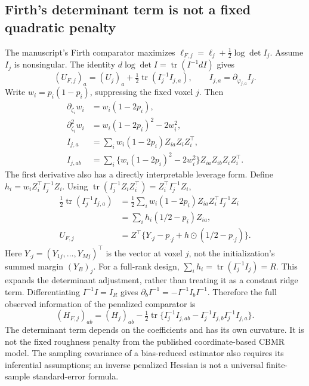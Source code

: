 \documentclass[11pt,a4paper]{article}
\newcommand{\tr}{\operatorname{tr}}
\numberwithin{equation}{section}
\begin{document}
\subsection{Firth's determinant term is not a fixed quadratic penalty}
The manuscript's Firth comparator maximizes
$\ell_{F,j}=\ell_j+\tfrac12\log\det I_j$.
Assume $I_j$ is nonsingular. The identity
$d\log\det I=\tr(I^{-1}dI)$ gives
\begin{equation}
 (U_{F,j})_a=(U_j)_a+\tfrac12\tr(I_j^{-1}I_{j,a}),
 \qquad I_{j,a}=\partial_{\varphi_{j,a}}I_j .
\end{equation}
Write $w_i=p_i(1-p_i)$, suppressing the fixed voxel $j$.
Then
\begin{align}
 \partial_{\zeta_i}w_i&=w_i(1-2p_i),\\
 \partial^2_{\zeta_i}w_i
 &=w_i(1-2p_i)^2-2w_i^2,\\
 I_{j,a}
 &=\sum_i w_i(1-2p_i)Z_{ia}Z_iZ_i^\top,\\
 I_{j,ab}
 &=\sum_i\{w_i(1-2p_i)^2-2w_i^2\}
                         Z_{ia}Z_{ib}Z_iZ_i^\top .
\end{align}
The first derivative also has a directly interpretable
leverage form. Define $h_i=w_i Z_i^\top I_j^{-1}Z_i$.
Using $\tr(I_j^{-1}Z_iZ_i^\top)=Z_i^\top I_j^{-1}Z_i$,
\begin{align}
 \tfrac12\tr(I_j^{-1}I_{j,a})
 &=\tfrac12\sum_i w_i(1-2p_i)Z_{ia}
                               Z_i^\top I_j^{-1}Z_i\\
 &=\sum_i h_i(1/2-p_i)Z_{ia},\\
 U_{F,j}&=Z^\top\{Y_{\cdot j}-p_{\cdot j}
                         +h\mathbin{\odot}(1/2-p_{\cdot j})\}.
\end{align}
Here $Y_{\cdot j}=(Y_{1j},\ldots,Y_{Mj})^\top$ is the vector
at voxel $j$, not the initialization's summed margin $(Y_B)_j$.
For a full-rank design,
$\sum_i h_i=\tr(I_j^{-1}I_j)=R$.
This expands the determinant adjustment, rather than treating it
as a constant ridge term.
Differentiating $I^{-1}I=I_R$ gives
$\partial_b I^{-1}=-I^{-1}I_bI^{-1}$.
Therefore the full observed information of the penalized comparator is
\begin{equation}
 (H_{F,j})_{ab}=(H_j)_{ab}
 -\tfrac12\tr\{I_j^{-1}I_{j,ab}
                   -I_j^{-1}I_{j,b}I_j^{-1}I_{j,a}\}.
\end{equation}
The determinant term depends on the coefficients and has its own
curvature. It is not the fixed roughness penalty from the
published coordinate-based CBMR model.
The sampling covariance of a bias-reduced estimator also requires
its inferential assumptions; an inverse penalized Hessian is
not a universal finite-sample standard-error formula.
\end{document}
